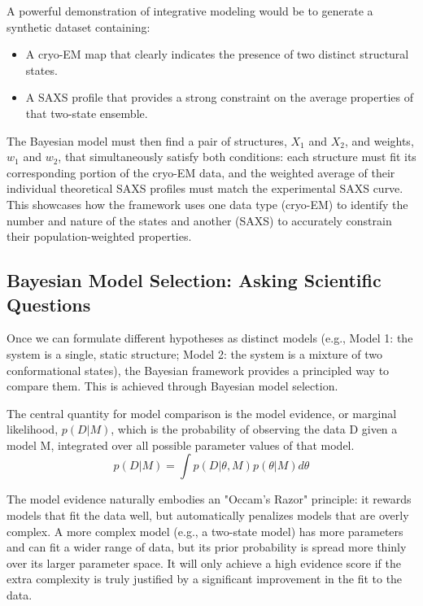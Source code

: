 \documentclass{article}
\begin{document}
A powerful demonstration of integrative modeling would be to generate a synthetic dataset containing:
\begin{itemize}
  \item A cryo-EM map that clearly indicates the presence of two distinct structural states.
  \item A SAXS profile that provides a strong constraint on the average properties of that two-state ensemble.
\end{itemize}

The Bayesian model must then find a pair of structures, $X_1$ and $X_2$, and weights, $w_1$ and $w_2$, that simultaneously satisfy both conditions: each structure must fit its corresponding portion of the cryo-EM data, and the weighted average of their individual theoretical SAXS profiles must match the experimental SAXS curve. This showcases how the framework uses one data type (cryo-EM) to identify the number and nature of the states and another (SAXS) to accurately constrain their population-weighted properties.

\subsection{Bayesian Model Selection: Asking Scientific Questions}

Once we can formulate different hypotheses as distinct models (e.g., Model 1: the system is a single, static structure; Model 2: the system is a mixture of two conformational states), the Bayesian framework provides a principled way to compare them. This is achieved through Bayesian model selection.

The central quantity for model comparison is the model evidence, or marginal likelihood, $p(D|M)$, which is the probability of observing the data D given a model M, integrated over all possible parameter values of that model.\cite{ref40}
\[ p(D | M) = \int p(D | \theta, M) p(\theta | M) d\theta \]

The model evidence naturally embodies an "Occam's Razor" principle: it rewards models that fit the data well, but automatically penalizes models that are overly complex.\cite{ref40} A more complex model (e.g., a two-state model) has more parameters and can fit a wider range of data, but its prior probability is spread more thinly over its larger parameter space. It will only achieve a high evidence score if the extra complexity is truly justified by a significant improvement in the fit to the data.
\end{document}
